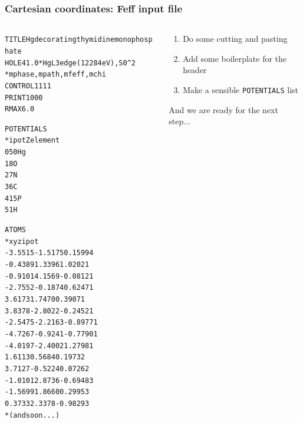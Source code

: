 \documentclass[10pt, xcolor=x11names, compress]{beamer}
\begin{document}
\begin{frame}[fragile]
  \frametitle{Cartesian coordinates: Feff input file}
  \begin{columns}
    \begin{column}{0.5\linewidth}
  \begin{alltt}
\tiny
 {\color{Green4}TITLE Hg decorating thymidine monophosphate}
 {\color{Purple2}HOLE}      4   1.0  {\color{Blue4} *  Hg L3 edge (12284 eV), S0^2}
 {\color{Blue4}*         mphase,mpath,mfeff,mchi}
 {\color{SteelBlue2}CONTROL}   1      1     1     1
 {\color{SteelBlue2}PRINT}     1      0     0     0
 {\color{Purple2}RMAX}      6.0

 {\color{Brown4}POTENTIALS}
 {\color{Blue4}*    ipot   Z  element}
        0   50   Hg
        1    8   O
        2    7   N
        3    6   C
        4   15   P
        5    1   H

 {\color{Brown4}ATOMS}
 {\color{Blue4}*   x         y         z    ipot}
   -3.5515   -1.5175    0.1599 4
   -0.4389    1.3396    1.0202 1
   -0.9101    4.1569   -0.0812 1
   -2.7552   -0.1874    0.6247 1
    3.6173    1.7470    0.3907 1
    3.8378   -2.8022   -0.2452 1
   -2.5475   -2.2163   -0.8977 1
   -4.7267   -0.9241   -0.7790 1
   -4.0197   -2.4002    1.2798 1
    1.6113    0.5684    0.1973 2
    3.7127   -0.5224    0.0726 2
   -1.0101    2.8736   -0.6948 3
   -1.5699    1.8660    0.2995 3
    0.3733    2.3378   -0.9829 3
 {\color{Blue4}*   (and so on...)}
  \end{alltt}
    \end{column}
    \begin{column}{0.5\linewidth}
      \begin{enumerate}
      \item Do some cutting and pasting
      \item Add some boilerplate for the header
      \item Make a sensible {\color{Brown4}\texttt{POTENTIALS}} list
      \end{enumerate}

      \bigskip

      And we are ready for the next step...
    \end{column}
  \end{columns}
\end{frame}
\end{document}
